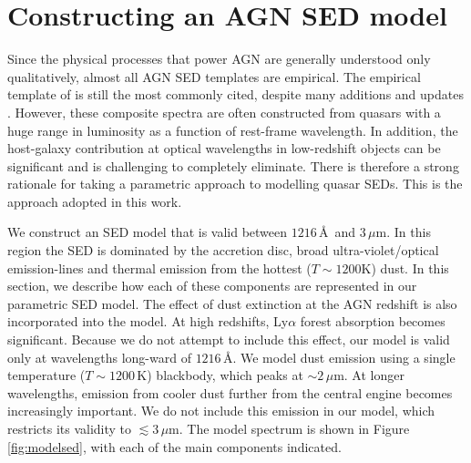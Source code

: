 \section{Constructing an AGN SED model}

Since the physical processes that power AGN are generally understood only qualitatively, almost all AGN SED templates are empirical. 
The empirical template of \citet{elvis94} is still the most commonly cited, despite many additions and updates \citep[e.g.][]{polletta00, kuraszkiewicz03, risaliti04, richards06,  polletta07, lusso10, shang11, marchese12, trichas12}. 
However, these composite spectra are often constructed from quasars with a huge range in luminosity as a function of rest-frame wavelength. 
In addition, the host-galaxy contribution at optical wavelengths in low-redshift objects can be significant and is challenging to completely eliminate. 
There is therefore a strong rationale for taking a parametric approach to modelling quasar SEDs. 
This is the approach adopted in this work. 

We construct an SED model that is valid between $1216$\,\AA\, and $3$\,$\mu$m.
In this region the SED is dominated by the accretion disc, broad ultra-violet/optical emission-lines and thermal emission from the hottest ($T\sim1200$K) dust. 
In this section, we describe how each of these components are represented in our parametric SED model.  
The effect of dust extinction at the AGN redshift is also incorporated into the model. 
At high redshifts, Ly$\alpha$ forest absorption becomes significant. 
Because we do not attempt to include this effect, our model is valid only at wavelengths long-ward of $1216$\,\AA. 
We model dust emission using a single temperature ($T\sim1200$\,K) blackbody, which peaks at $\sim2$\,$\mu$m. 
At longer wavelengths, emission from cooler dust further from the central engine becomes increasingly important. 
We do not include this emission in our model, which restricts its validity to $\lesssim3$\,$\mu$m.
The model spectrum is shown in Figure \ref{fig:modelsed}, with each of the main components indicated. 

